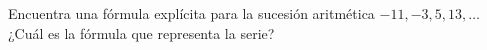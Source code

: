 \question[10] Encuentra una fórmula explícita para la sucesión aritmética  $-11,-3,5,13, \dots$ 
¿Cu\'al es la f\'ormula que representa la serie? \fillin[$-11+8(n-1)$]
